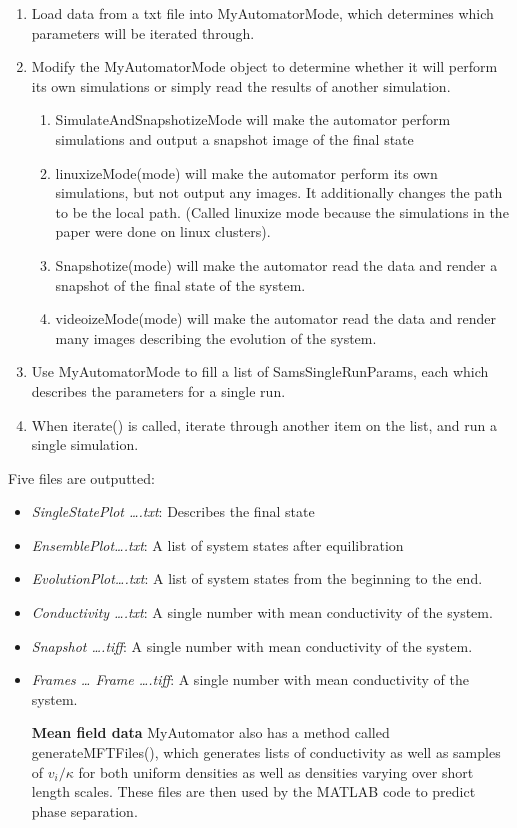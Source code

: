 \documentclass[rspublic, aps, superscriptaddress,preprintnumbers, showpacs, notitlepage]{revtex4-1}
\def \conduct{\ensuremath{\kappa} \xspace}
\begin{document}
\begin{enumerate}
\item Load data from a txt file into MyAutomatorMode, which determines which parameters will be iterated through. 
%
\item Modify the MyAutomatorMode object to determine whether it will perform its own simulations or simply read the results of another simulation. 
\begin{enumerate}
	\item SimulateAndSnapshotizeMode will make the automator perform simulations and output a snapshot image of the final state
	\item  linuxizeMode(mode) will make the automator perform its own simulations, but not output any images. It additionally changes the path to be the local path. (Called linuxize mode because the simulations in the paper were done on linux clusters). 
	\item     Snapshotize(mode) will make the automator read the data and render a snapshot of the final state of the system.
	\item  videoizeMode(mode) will make the automator read the data and render many images describing the evolution of the system. 
	\end{enumerate}
\item Use MyAutomatorMode to fill a list of SamsSingleRunParams, each which describes the parameters for a single run. 
\item When iterate() is called, iterate through another item on the list, and run a single simulation. 
%
\end{enumerate}


Five files are outputted:

\begin{itemize}
\item
\emph{SingleStatePlot \ldots .txt}: Describes the final state

\item
\emph{EnsemblePlot\ldots .txt}: A list of system states after equilibration

\item
\emph{EvolutionPlot\ldots .txt}: A list of system states from the beginning to the end.

\item 
\emph{Conductivity \ldots .txt}: A single number with mean conductivity of the system. 

\item 

\emph{Snapshot \ldots .tiff}: A single number with mean conductivity of the system. 

\item 

\emph{Frames \ldots \text{/} Frame \ldots.tiff}: A single number with mean conductivity of the system. 



\textbf{Mean field data}
MyAutomator also has a method called generateMFTFiles(), which generates lists of conductivity as well as samples of $v_{i}/\conduct$ for both uniform densities as well as densities varying over short length scales. These files are then used by the MATLAB code to predict phase separation. 
\end{itemize}
\end{document}
